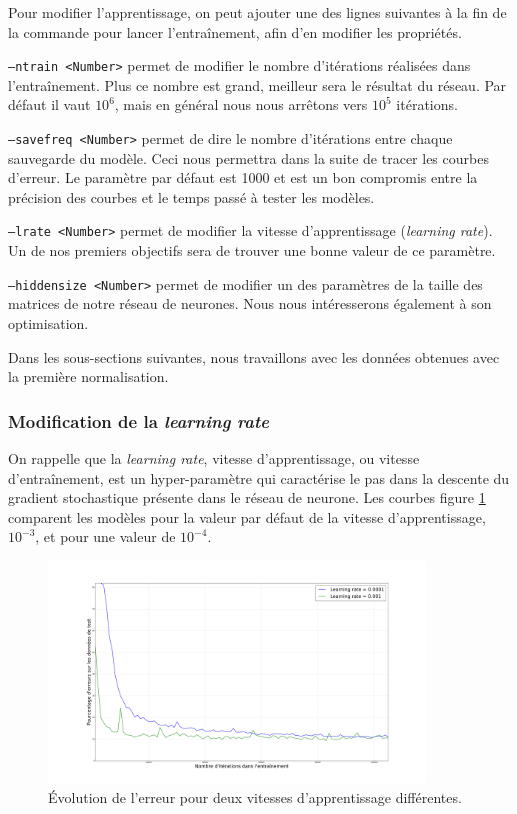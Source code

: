 \documentclass{report}
\begin{document}
Pour modifier l'apprentissage, on peut ajouter une des lignes suivantes à la fin de la commande pour lancer l'entraînement, afin d'en modifier les propriétés.

\texttt{--ntrain <Number>} permet de modifier le nombre d'itérations réalisées dans l'entraînement.
Plus ce nombre est grand, meilleur sera le résultat du réseau.
Par défaut il vaut $10^6$, mais en général nous nous arrêtons vers $10^5$ itérations.

\texttt{--savefreq <Number>} permet de dire le nombre d'itérations entre chaque sauvegarde du modèle.
Ceci nous permettra dans la suite de tracer les courbes d'erreur.
Le paramètre par défaut est 1000 et est un bon compromis entre la précision des courbes et le temps passé à tester les modèles.

\texttt{--lrate <Number>} permet de modifier la vitesse d'apprentissage (\textit{learning rate}).
Un de nos premiers objectifs sera de trouver une bonne valeur de ce paramètre.

\texttt{--hiddensize <Number>} permet de modifier un des paramètres de la taille des matrices de notre réseau de neurones.
Nous nous intéresserons également à son optimisation.

Dans les sous-sections suivantes, nous travaillons avec les données obtenues avec la première normalisation.

\subsubsection{Modification de la \textit{learning rate}}

On rappelle que la \textit{learning rate}, vitesse d'apprentissage, ou vitesse d'entraînement, est un hyper-paramètre qui caractérise le pas dans la descente du gradient stochastique présente dans le réseau de neurone.
Les courbes figure \ref{err_lrate} comparent les modèles pour la valeur par défaut de la vitesse d'apprentissage, $10^{-3}$, et pour une valeur de $10^{-4}$. 

\begin{figure}[!h] 
    \center
    \includegraphics[width=10cm]{error_plot_lrat.png}
    \caption{Évolution de l'erreur pour deux vitesses d'apprentissage différentes.}
    \label{err_lrate}
\end{figure}
\end{document}
